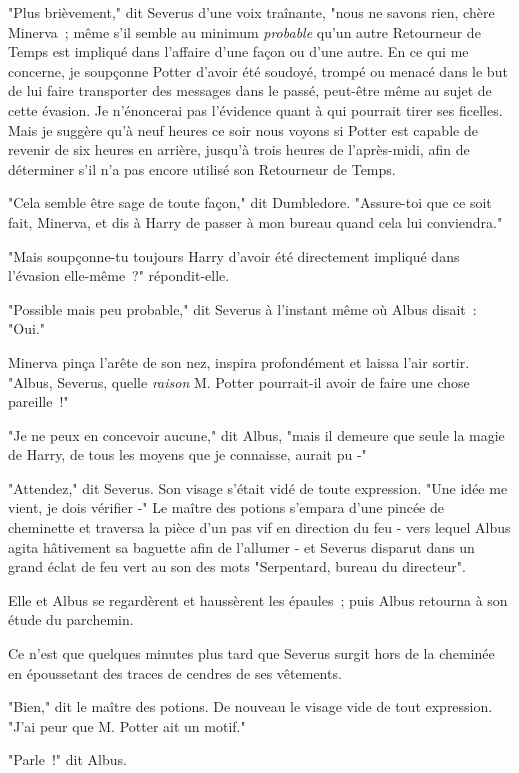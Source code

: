 "Plus brièvement," dit Severus d'une voix traînante, "nous ne savons rien, chère Minerva~; même s'il semble au minimum \emph{probable} qu'un autre Retourneur de Temps est impliqué dans l'affaire d'une façon ou d'une autre. En ce qui me concerne, je soupçonne Potter d'avoir été soudoyé, trompé ou menacé dans le but de lui faire transporter des messages dans le passé, peut-être même au sujet de cette évasion. Je n'énoncerai pas l'évidence quant à qui pourrait tirer ses ficelles. Mais je suggère qu'à neuf heures ce soir nous voyons si Potter est capable de revenir de six heures en arrière, jusqu'à trois heures de l'après-midi, afin de déterminer s'il n'a pas encore utilisé son Retourneur de Temps.

"Cela semble être sage de toute façon," dit Dumbledore. "Assure-toi que ce soit fait, Minerva, et dis à Harry de passer à mon bureau quand cela lui conviendra."

"Mais soupçonne-tu toujours Harry d'avoir été directement impliqué dans l'évasion elle-même~?" répondit-elle.

"Possible mais peu probable," dit Severus à l'instant même où Albus disait~: "Oui."

Minerva pinça l'arête de son nez, inspira profondément et laissa l'air sortir. "Albus, Severus, quelle \emph{raison} M. Potter pourrait-il avoir de faire une chose pareille~!"

"Je ne peux en concevoir aucune," dit Albus, "mais il demeure que seule la magie de Harry, de tous les moyens que je connaisse, aurait pu -"

"Attendez," dit Severus. Son visage s'était vidé de toute expression. "Une idée me vient, je dois vérifier -" Le maître des potions s'empara d'une pincée de cheminette et traversa la pièce d'un pas vif en direction du feu - vers lequel Albus agita hâtivement sa baguette afin de l'allumer - et Severus disparut dans un grand éclat de feu vert au son des mots "Serpentard, bureau du directeur".

Elle et Albus se regardèrent et haussèrent les épaules~; puis Albus retourna à son étude du parchemin.

Ce n'est que quelques minutes plus tard que Severus surgit hors de la cheminée en époussetant des traces de cendres de ses vêtements.

"Bien," dit le maître des potions. De nouveau le visage vide de tout expression. "J'ai peur que M. Potter ait un motif."

"Parle~!" dit Albus.

